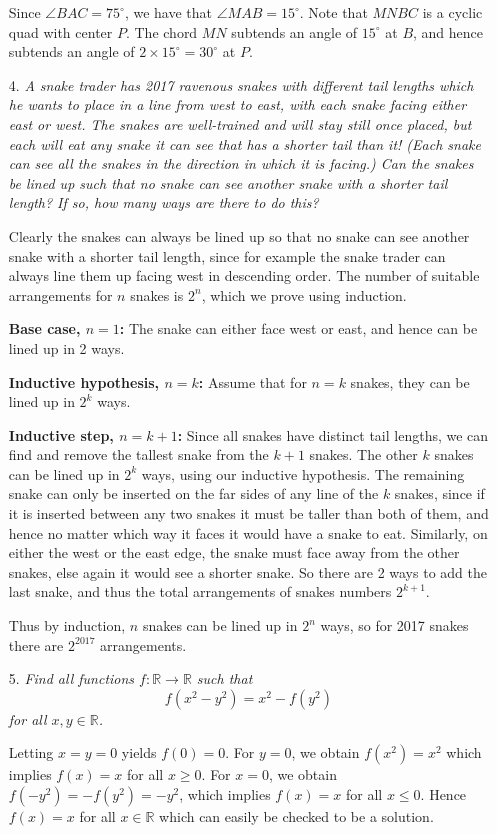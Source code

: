 \documentclass[12pt]{article}
\begin{document}
\begin{enumerate}
Since $\angle BAC = 75^\circ$, we have that $\angle MAB = 15^\circ$. Note that
$MNBC$ is a cyclic quad with center $P$. The chord $MN$ subtends an angle of
$15^\circ$ at $B$, and hence subtends an angle of $2 \times 15^\circ = 30^\circ$
at $P$.


\item[4.] \emph{A snake trader has 2017 ravenous snakes with different tail lengths which he wants to place in a line from west to east, with each snake facing either east or west. The snakes are well-trained and will stay still once placed, but each will eat any snake it can see that has a shorter tail than it! (Each snake can see all the snakes in the direction in which it is facing.) Can the snakes be lined up such that no snake can see another snake with a shorter tail length? If so, how many ways are there to do this?}

Clearly the snakes can always be lined up so that no snake can see another snake with a shorter tail length, since for example the snake trader can always line them up facing west in descending order. The number of suitable arrangements for $n$ snakes is $2^n$, which we prove using induction.

\textbf{Base case, $n =1$:} The snake can either face west or east, and hence can be lined up in 2 ways.

\textbf{Inductive hypothesis, $n=k$:} Assume that for $n=k$ snakes, they can be lined up in $2^k$ ways.

\textbf{Inductive step, $n=k+1$:} Since all snakes have distinct tail lengths, we can find and remove the tallest snake from the $k+1$ snakes. The other $k$ snakes can be lined up in $2^k$ ways, using our inductive hypothesis. The remaining snake can only be inserted on the far sides of any line of the $k$ snakes, since if it is inserted between any two snakes it must be taller than both of them, and hence no matter which way it faces it would have a snake to eat. Similarly, on either the west or the east edge, the snake must face away from the other snakes, else again it would see a shorter snake. So there are 2 ways to add the last snake, and thus the total arrangements of snakes numbers $2^{k+1}$.

Thus by induction, $n$ snakes can be lined up in $2^n$ ways, so for 2017 snakes there are $2^{2017}$ arrangements.


\item[5.] \emph{Find all functions $f : \mathbb{R} \to \mathbb{R}$ such that
	\[f(x^2-y^2) = x^2 - f(y^2)\]
for all $x,y \in \mathbb{R}$.}

Letting $x = y = 0$ yields $f(0) = 0$. For $y = 0$, we obtain $f(x^2) = x^2$ which implies $f(x) = x$ for all $x \geq 0$. For $x = 0$, we obtain $f(-y^2) = -f(y^2) = -y^2$, which implies $f(x) = x$ for all $x \leq 0$. Hence $f(x) = x$ for all $x \in \mathbb{R}$ which can easily be checked to be a solution.

\end{enumerate}
\end{document}
